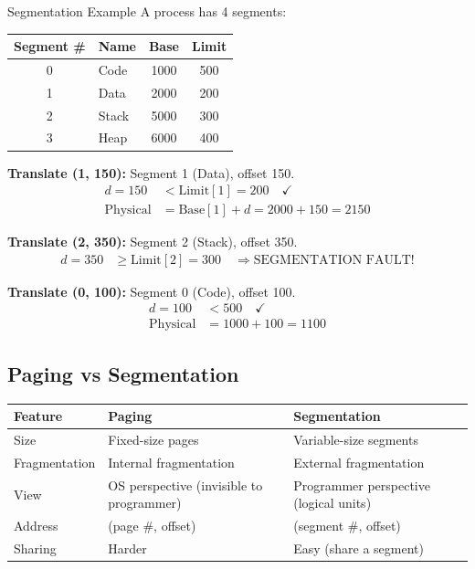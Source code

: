 \documentclass[12pt,a4paper]{article}
\begin{document}
\begin{examplebox}{Segmentation Example}
A process has 4 segments:

\begin{center}
\begin{tabular}{@{} c l c c @{}}
\toprule
\textbf{Segment \#} & \textbf{Name} & \textbf{Base} & \textbf{Limit} \\
\midrule
0 & Code & 1000 & 500 \\
1 & Data & 2000 & 200 \\
2 & Stack & 5000 & 300 \\
3 & Heap & 6000 & 400 \\
\bottomrule
\end{tabular}
\end{center}

\textbf{Translate (1, 150):} Segment 1 (Data), offset 150.
\begin{align*}
d = 150 &< \text{Limit}[1] = 200 \quad \checkmark \\
\text{Physical} &= \text{Base}[1] + d = 2000 + 150 = \boxed{2150}
\end{align*}

\textbf{Translate (2, 350):} Segment 2 (Stack), offset 350.
\begin{align*}
d = 350 &\geq \text{Limit}[2] = 300 \quad \Rightarrow \boxed{\text{SEGMENTATION FAULT!}}
\end{align*}

\textbf{Translate (0, 100):} Segment 0 (Code), offset 100.
\begin{align*}
d = 100 &< 500 \quad \checkmark \\
\text{Physical} &= 1000 + 100 = \boxed{1100}
\end{align*}
\end{examplebox}

\subsection{Paging vs Segmentation}
\begin{center}
\begin{tabular}{@{} l p{5.5cm} p{5.5cm} @{}}
\toprule
\textbf{Feature} & \textbf{Paging} & \textbf{Segmentation} \\
\midrule
Size & Fixed-size pages & Variable-size segments \\
Fragmentation & Internal fragmentation & External fragmentation \\
View & OS perspective (invisible to programmer) & Programmer perspective (logical units) \\
Address & (page \#, offset) & (segment \#, offset) \\
Sharing & Harder & Easy (share a segment) \\
\bottomrule
\end{tabular}
\end{center}
\end{document}
